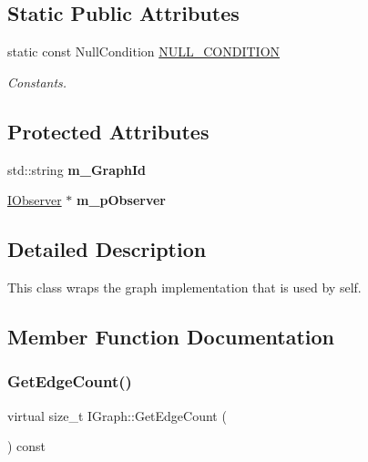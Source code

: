 \subsection*{Static Public Attributes}
\begin{DoxyCompactItemize}
\item 
\mbox{\label{class_i_graph_af5f1100a2f9d5a6f7e795bd7b2d642a4}} 
static const Null\+Condition \hyperlink{class_i_graph_af5f1100a2f9d5a6f7e795bd7b2d642a4}{N\+U\+L\+L\+\_\+\+C\+O\+N\+D\+I\+T\+I\+ON}
\begin{DoxyCompactList}\small\item\em Constants. \end{DoxyCompactList}\end{DoxyCompactItemize}
\subsection*{Protected Attributes}
\begin{DoxyCompactItemize}
\item 
\mbox{\label{class_i_graph_a7aac8a2403da511779f75bc2560305c6}} 
std\+::string {\bfseries m\+\_\+\+Graph\+Id}
\item 
\mbox{\label{class_i_graph_aacdddd06e0c7268596f9f543e042f5e5}} 
\hyperlink{class_i_graph_1_1_i_observer}{I\+Observer} $\ast$ {\bfseries m\+\_\+p\+Observer}
\end{DoxyCompactItemize}


\subsection{Detailed Description}
This class wraps the graph implementation that is used by self. 

\subsection{Member Function Documentation}
\mbox{\label{class_i_graph_a46918c61445d33e70de6636b81e0a829}} 
\subsubsection{\texorpdfstring{Get\+Edge\+Count()}{GetEdgeCount()}}
{\footnotesize\ttfamily virtual size\+\_\+t I\+Graph\+::\+Get\+Edge\+Count (\begin{DoxyParamCaption}{ }\end{DoxyParamCaption}) const\hspace{0.3cm}{\ttfamily [pure virtual]}}

